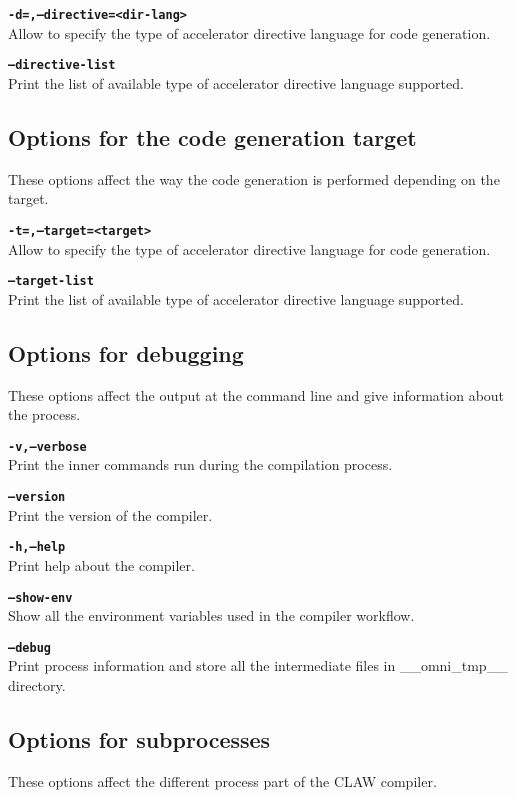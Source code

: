 \documentclass{article}
\begin{document}
\textbf{\texttt{-d=,--directive=<dir-lang>}}\\
Allow to specify the type of accelerator directive language for code generation.

\textbf{\texttt{--directive-list}}\\
Print the list of available type of accelerator directive language supported.

\subsection{Options for the code generation target}
These options affect the way the code generation is performed depending on the target.

\textbf{\texttt{-t=,--target=<target>}}\\
Allow to specify the type of accelerator directive language for code generation.
   
\textbf{\texttt{--target-list}}\\
Print the list of available type of accelerator directive language supported.

\subsection{Options for debugging}
These options affect the output at the command line and give information about the process. 

\textbf{\texttt{-v,--verbose}}\\
Print the inner commands run during the compilation process. 

\textbf{\texttt{--version}}\\
Print the version of the compiler. 

\textbf{\texttt{-h,--help}}\\
Print help about the compiler. 

\textbf{\texttt{--show-env}}\\
Show all the environment variables used in the compiler workflow. 

\textbf{\texttt{--debug}}\\
Print process information and store all the intermediate files in \_\_omni\_tmp\_\_ directory. 

\subsection{Options for subprocesses}
These options affect the different process part of the CLAW compiler. 
\end{document}
